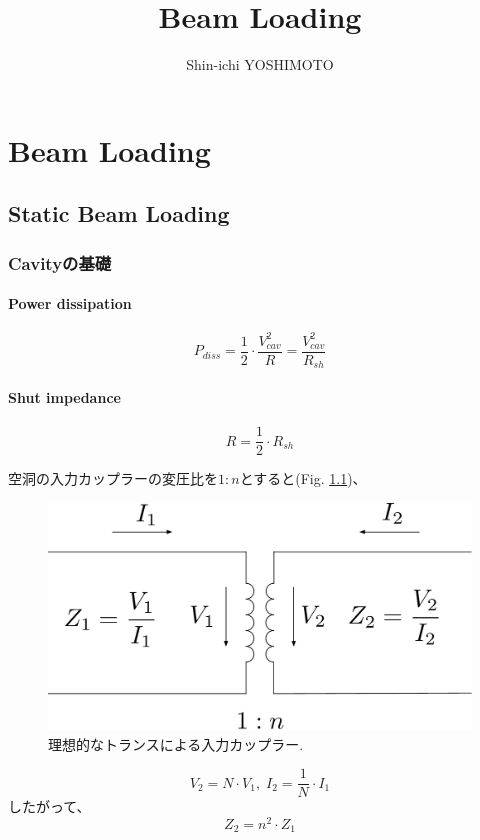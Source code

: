 \documentclass[book]{jlreq}
\begin{document}
\title{Beam Loading}
\author{Shin-ichi YOSHIMOTO}
\maketitle
\tableofcontents

\part{Beam Loading}
\chapter{Static Beam Loading}
\section{Cavityの基礎}
\subsection{Power dissipation}
\begin{equation}
    P_{diss} = \frac{1}{2} \cdot \frac{V_{cav}^2}{R} = \frac{V_{cav}^2}{R_{sh}} 
\end{equation}

\subsection{Shut impedance}
\begin{equation}
    R = \frac{1}{2}\cdot R_{sh}
\end{equation}

空洞の入力カップラーの変圧比を$1:n$とすると(Fig. \ref{fig:Ideal_Trans})、
%
\begin{figure}[hbt]
    \begin{center}
        \includegraphics[width=12cm,clip]{figs/Ideal_Transformer.pdf}
        \caption{理想的なトランスによる入力カップラー.}
        \label{fig:Ideal_Trans}
    \end{center}
\end{figure}
%
\begin{equation}
    V_2 = N\cdot V_1, \; I_2 = \frac{1}{N}\cdot I_1
\end{equation}
%
したがって、
\begin{equation}
    Z_2 = n^2 \cdot Z_1 
\end{equation}
\end{document}
